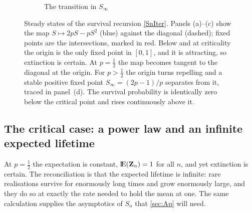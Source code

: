 \begin{figure}[htbp]
    \vspace{10pt}
    \begin{subfigure}[b]{0.55\textwidth}
    \centering
    \caption{The transition in $S_\infty$}
    \end{subfigure}

    \caption{Steady states of the survival recursion \cref{SnIter}. Panels (a)--(c)
    show the map $S\mapsto 2pS-pS^{2}$ (blue) against the diagonal (dashed); fixed
    points are the intersections, marked in red. Below and at criticality the origin
    is the only fixed point in $[0,1]$, and it is attracting, so extinction is
    certain. At $p=\tfrac12$ the map becomes tangent to the diagonal at the origin.
    For $p>\tfrac12$ the origin turns repelling and a stable positive fixed point
    $S_\infty=(2p-1)/p$ separates from it, traced in panel~(d). The survival
    probability is identically zero below the critical point and rises continuously
    above it.}
    \label{fig:phase_transition}
\end{figure}

\subsection{The critical case: a power law and an infinite expected lifetime}
\label{sec:criticalcase}

At $p=\tfrac12$ the expectation is constant, ${\rm I}\!{\rm E}({\bf Z}_n) = 1$ for all $n$, and yet
extinction is certain. The reconciliation is that the expected lifetime is infinite:
rare realisations survive for enormously long times and grow enormously large, and they
do so at exactly the rate needed to hold the mean at one. The same calculation supplies
the asymptotics of $S_n$ that \cref{sec:Ap} will need.

